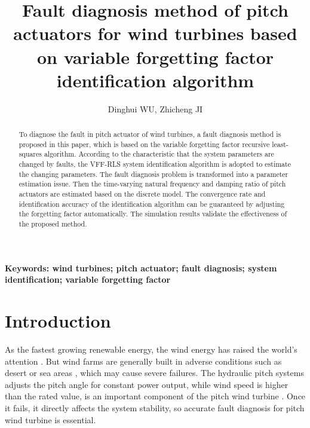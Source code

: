 \documentclass{article}
\begin{document}
\title{Fault diagnosis method of pitch actuators for wind turbines based on variable forgetting factor identification algorithm}

\author{Dinghui WU,
        Zhicheng JI}
\date{}
\maketitle


\begin{abstract}
To diagnose the fault in pitch actuator of wind turbines, a fault diagnosis method is proposed
in this paper, which is based on the variable forgetting factor recursive least-squares
algorithm. According to the characteristic that the system parameters are changed by faults,
the VFF-RLS system identification algorithm is adopted to estimate the changing
parameters. The fault diagnosis problem is transformed into a parameter estimation
issue. Then the time-varying natural frequency and damping ratio of pitch actuators
are estimated based on the discrete model. The convergence rate and identification accuracy of the
identification algorithm can be guaranteed by adjusting the forgetting factor automatically.
The simulation results validate the effectiveness of the proposed method.
\end{abstract}

\textbf{Keywords: wind turbines; pitch actuator; fault diagnosis; system identification; variable forgetting factor}





\section{Introduction}

As the fastest growing renewable energy, the wind energy has raised
the world's attention \cite{ref:1}. But wind farms are generally built
in adverse conditions such as desert or sea areas \cite{ref:2}, which
may cause severe failures. The hydraulic pitch systems adjusts the pitch angle
for constant power output, while wind speed is higher than the rated value,
is an important component of the pitch wind turbine \cite{ref:3}.
Once it fails, it directly affects the system stability, so accurate fault
diagnosis for pitch wind turbine is essential.
\end{document}
